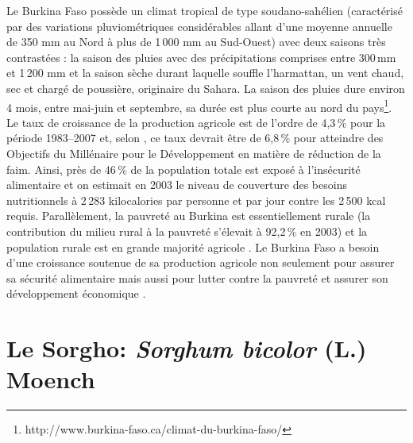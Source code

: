 \documentclass[a4paper,11pt]{article}
\begin{document}
Le Burkina Faso possède un climat tropical de type soudano-sahélien
(caractérisé par des variations pluviométriques considérables allant
d'une moyenne annuelle de 350 mm au Nord à plus de 1\,000 mm au
Sud-Ouest) avec deux saisons très contrastées : la saison des pluies
avec des précipitations comprises entre 300\,mm et 1\,200 mm et la
saison sèche durant laquelle souffle l'harmattan, un vent chaud, sec
et chargé de poussière, originaire du Sahara. La saison des pluies
dure environ 4 mois, entre mai-juin et septembre, sa durée est plus
courte au nord du
pays\footnote{http://www.burkina-faso.ca/climat-du-burkina-faso/}. Le
taux de croissance de la production agricole est de l'ordre de 4,3\,\%
pour la période 1983--2007 et, selon , ce taux
devrait être de 6,8\,\% pour atteindre des Objectifs du Millénaire
pour le Développement en matière de réduction de la faim. Ainsi, près
de 46\,\% de la population totale est exposé à l'insécurité
alimentaire et on estimait en 2003 le niveau de couverture des besoins
nutritionnels à 2\,283 kilocalories par personne et par jour contre
les 2\,500 kcal requis. Parallèlement, la pauvreté au Burkina est
essentiellement rurale (la contribution du milieu rural à la pauvreté
s'élevait à 92,2\,\% en 2003) et la population rurale est en grande
majorité agricole \cite{DPSAA_2011}. Le Burkina Faso a besoin d'une
croissance soutenue de sa production agricole non seulement pour
assurer sa sécurité alimentaire mais aussi pour lutter contre la
pauvreté et assurer son développement économique
\cite{Koulibi_FideleZONGO}.

\section{Le Sorgho: \emph{Sorghum bicolor} (L.) Moench}



\end{document}
